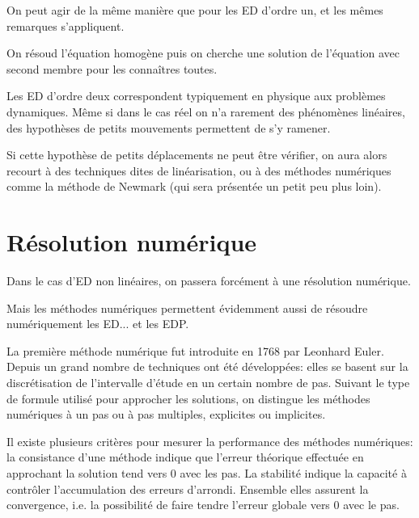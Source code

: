 On peut agir de la même manière que pour les ED d'ordre un, et les mêmes
remarques s'appliquent.

On résoud l'équation homogène puis on cherche une solution de l'équation avec second membre 
pour les connaîtres toutes.

\medskip
Les ED d'ordre deux correspondent typiquement en physique aux problèmes dynamiques.
Même si dans le cas réel on n'a rarement des phénomènes linéaires, des hypothèses
de petits mouvements permettent de s'y ramener.

Si cette hypothèse de petits déplacements ne peut être vérifier, on aura
alors recourt à des techniques dites de linéarisation, ou à des méthodes
numériques comme la méthode de Newmark (qui sera présentée un petit peu
plus loin).










\bigskip
\newpage%
\section{Résolution numérique}

Dans le cas d'ED non linéaires, on passera forcément à une résolution numérique.

Mais les méthodes numériques permettent évidemment aussi de résoudre
numériquement les ED... et les EDP.

\bigskip
\begin{histoire}%
La première méthode numérique fut introduite en 1768 par Leonhard Euler. 
Depuis un grand nombre de techniques ont été développées: 
elles se basent sur la discrétisation de l'intervalle d'étude en un certain nombre de pas. 
Suivant le type de formule utilisé pour approcher les solutions, on distingue les méthodes 
numériques à un pas ou à pas multiples, explicites ou implicites.

\medskip
Il existe plusieurs critères pour mesurer la performance des méthodes numériques: 
la consistance d'une méthode indique que l'erreur théorique effectuée en approchant 
la solution tend vers 0 avec les pas. 
La stabilité indique la capacité à contrôler l'accumulation des erreurs d'arrondi. 
Ensemble elles assurent la convergence, i.e. la possibilité de faire tendre l'erreur globale 
vers 0 avec le pas.
\end{histoire}

